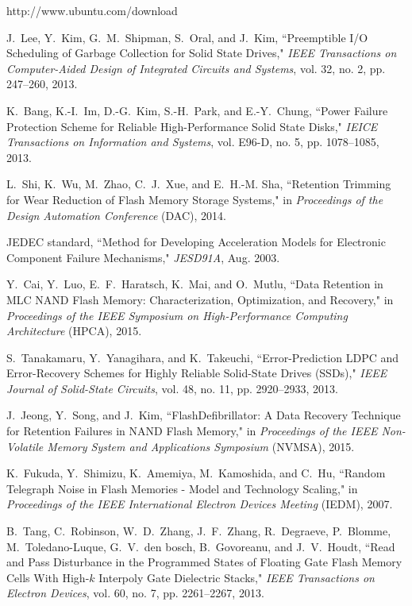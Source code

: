 \begin{thebibliography}{00}
http://www.ubuntu.com/download

J.~Lee, Y.~Kim, G.~M.~Shipman, S.~Oral, and J.~Kim,
``Preemptible I/O Scheduling of Garbage Collection for Solid State Drives,"
\emph{IEEE Transactions on Computer-Aided Design of Integrated Circuits and Systems}, vol. 32, no. 2, pp. 247--260, 2013.

K.~Bang, K.-I.~Im, D.-G.~Kim, S.-H.~Park, and E.-Y.~Chung,
``Power Failure Protection Scheme for Reliable High-Performance Solid State Disks,"
\emph{IEICE Transactions on Information and Systems}, vol. E96-D, no. 5, pp. 1078--1085, 2013.

L.~Shi, K.~Wu, M.~Zhao, C.~J.~Xue, and E.~H.-M. Sha,
``Retention Trimming for Wear Reduction of Flash Memory Storage Systems,"
in \emph{Proceedings of the Design Automation Conference} (DAC), 2014.

JEDEC standard,
``Method for Developing Acceleration Models for Electronic Component Failure Mechanisms,"
\emph{JESD91A}, Aug. 2003.

Y.~Cai, Y.~Luo, E.~F.~Haratsch, K.~Mai, and O.~Mutlu,
``Data Retention in MLC NAND Flash Memory: Characterization, Optimization, and Recovery,"
in \emph{Proceedings of the IEEE Symposium on High-Performance Computing Architecture} (HPCA), 2015.

S.~Tanakamaru, Y.~Yanagihara, and K.~Takeuchi,
``Error-Prediction LDPC and Error-Recovery Schemes for Highly Reliable Solid-State Drives (SSDs),"
\emph{IEEE Journal of Solid-State Circuits}, vol. 48, no. 11, pp. 2920--2933, 2013.

J.~Jeong, Y.~Song, and J.~Kim,
``FlashDefibrillator: A Data Recovery Technique for Retention Failures in NAND Flash Memory,"
in \emph{Proceedings of the IEEE Non-Volatile Memory System and Applications Symposium} (NVMSA), 2015.

K.~Fukuda, Y.~Shimizu, K.~Amemiya, M.~Kamoshida, and C.~Hu,
``Random Telegraph Noise in Flash Memories - Model and Technology Scaling,"
in \emph{Proceedings of the IEEE International Electron Devices Meeting} (IEDM), 2007.

B.~Tang, C.~Robinson, W.~D.~Zhang, J.~F.~Zhang, R.~Degraeve, P.~Blomme, M.~Toledano-Luque, G.~V.~den bosch, B.~Govoreanu, and J.~V.~Houdt,
``Read and Pass Disturbance in the Programmed States of Floating Gate Flash Memory Cells With High-$k$ Interpoly Gate Dielectric Stacks,"
\emph{IEEE Transactions on Electron Devices}, vol. 60, no. 7, pp. 2261--2267, 2013.


\end{thebibliography}
